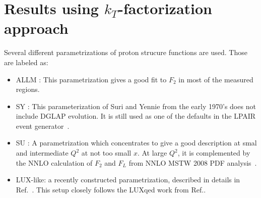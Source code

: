 \section{Results using $k_T$-factorization approach}


Several different parametrizations of proton strucure functions are used. Those are labeled as:
\begin{itemize} 

 \item ALLM \cite{Abramowicz:1991xz,Abramowicz:1997ms}: This parametrization gives a good fit to $F_2$ in most of the measured regions.
   
  
\item SY \cite{Suri:1971yx}: This parameterization of Suri and Yennie from the early 1970's does not include DGLAP evolution. It is still  used as one of the defaults in the LPAIR event generator~\cite{Vermaseren:1982cz}.
    
\item SU \cite{Szczurek:1999rd}: A parametrization which concentrates to give a good description at smal and intermediate $Q^2$ at not too small $x$.
At large $Q^2$, it is complemented by the NNLO calculation of $F_2$ and $F_L$ from NNLO MSTW 2008 PDF analysis~\cite{Martin:2009iq}.
   
\item LUX-like: a recently constructed parametrization, described in details in Ref.~\cite{Luszczak:2018ntp}.
This setup closely follows the LUXqed work from Ref.\cite{Manohar:2017eqh}.
\end{itemize} 

